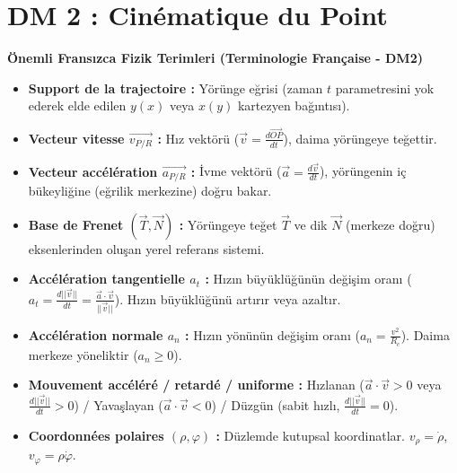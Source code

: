 \documentclass[11pt,a4paper]{article}
\begin{document}
\newpage

\part*{DM 2 : Cinématique du Point}

\begin{terimbox}{\textbf{Önemli Fransızca Fizik Terimleri (Terminologie Française - DM2)}}
\begin{itemize}
    \item \textbf{Support de la trajectoire :} Yörünge eğrisi (zaman $t$ parametresini yok ederek elde edilen $y(x)$ veya $x(y)$ kartezyen bağıntısı).
    \item \textbf{Vecteur vitesse $\vec{v_{P/R}}$ :} Hız vektörü ($\vec{v} = \frac{d\vec{OP}}{dt}$), daima yörüngeye teğettir.
    \item \textbf{Vecteur accélération $\vec{a_{P/R}}$ :} İvme vektörü ($\vec{a} = \frac{d\vec{v}}{dt}$), yörüngenin iç bükeyliğine (eğrilik merkezine) doğru bakar.
    \item \textbf{Base de Frenet $(\vec{T}, \vec{N})$ :} Yörüngeye teğet $\vec{T}$ ve dik $\vec{N}$ (merkeze doğru) eksenlerinden oluşan yerel referans sistemi.
    \item \textbf{Accélération tangentielle $a_t$ :} Hızın büyüklüğünün değişim oranı ($a_t = \frac{d||\vec{v}||}{dt} = \frac{\vec{a}\cdot\vec{v}}{||\vec{v}||}$). Hızın büyüklüğünü artırır veya azaltır.
    \item \textbf{Accélération normale $a_n$ :} Hızın yönünün değişim oranı ($a_n = \frac{v^2}{R_c}$). Daima merkeze yöneliktir ($a_n \ge 0$).
    \item \textbf{Mouvement accéléré / retardé / uniforme :} Hızlanan ($\vec{a}\cdot\vec{v} > 0$ veya $\frac{d||\vec{v}||}{dt} > 0$) / Yavaşlayan ($\vec{a}\cdot\vec{v} < 0$) / Düzgün (sabit hızlı, $\frac{d||\vec{v}||}{dt} = 0$).
    \item \textbf{Coordonnées polaires $(\rho, \varphi)$ :} Düzlemde kutupsal koordinatlar. $v_\rho = \dot{\rho}$, $v_\varphi = \rho\dot{\varphi}$.
\end{itemize}
\end{terimbox}

\vspace{0.5cm}
\end{document}
